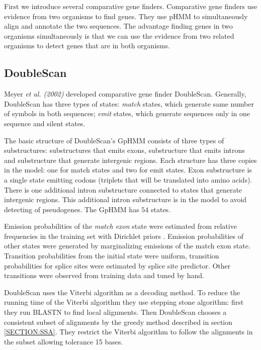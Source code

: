 First we introduce several comparative gene finders. Comparative gene finders
use evidence from two organisms to find genes. They use pHMM to simultaneously
align and annotate the two sequences. The advantage finding genes in two
organisms simultaneously is that we can use the evidence from two related
organisms to detect genes that are in both organisms.

\subsection{DoubleScan}
Meyer {\it et al. (2002)} developed comparative gene finder DoubleScan.
Generally, DoubleScan has three types of states: {\it match} states, which
generate same number of symbols in both sequences;   {\it emit} states, which
generate sequences only in one sequence and silent states.  

The basic structure of DoubleScan's GpHMM consists of three types of
substructures: substructures that emits exons, substructure that emits introns
and substructure that generate intergenic regions. Each structure has three
copies in the model: one for match states and two for emit states. Exon
substructure is a single state emitting codons (triplets that will be translated
into amino acids).  There is one additional intron substructure connected to
states that generate intergenic regions. This additional intron substructure is
in the model to avoid detecting of pseudogenes. The GpHMM has $54$ states.

\nocite{Meyer2002}

Emission probabilities of the {\it match exon} state were estimated from
relative frequencies in the training set with Dirichlet priors
\cite{Meyer2002,Durbin1998}.  Emission probabilities of other states were
generated  by marginalizing emissions of the match exon state. Transition
probabilities from the initial state were uniform, transition probabilities for
splice sites were estimated by splice site predictor. Other transitions were
observed from training data and tuned by hand.

DoubleScan uses the Viterbi algorithm as a decoding method.  To reduce the
running time of the Viterbi algorithm they use stepping stone algorithm: first
they run BLASTN to find local alignments. Then DoubleScan chooses a consistent
subset of alignments by the greedy method described in section
\ref{SECTION:SSA}. They restrict the Viterbi algorithm to follow the alignments
in the subset allowing tolerance 15 bases.

